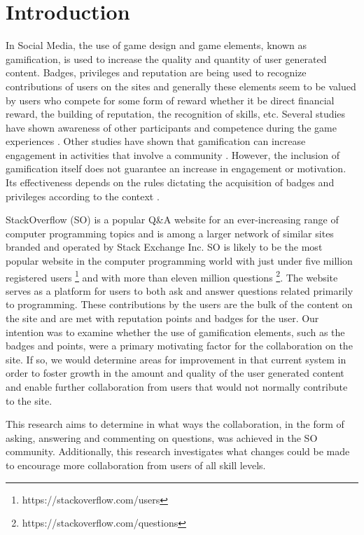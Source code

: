 \documentclass{sigchi}
\def\plainkeywords{Gamification; StackOverflow (SO)}
\begin{document}
\keywords{\plainkeywords}


\section{Introduction}
In Social Media, the use of game design and game elements, known as gamification, is used to increase the quality and quantity of user generated content. Badges, privileges and reputation are being used to recognize contributions of users on the sites and generally these elements seem to be valued by users who compete for some form of reward whether it be direct financial reward, the building of reputation, the recognition of skills, etc. Several studies have shown awareness of other participants and competence during the game experiences \cite{Rughinis}. Other studies have shown that gamification can increase engagement in activities that involve a community \cite{Marder}. However, the inclusion of gamification itself does not guarantee an increase in engagement or motivation. Its effectiveness depends on the rules dictating the acquisition of badges and privileges according to the context \cite{Deterding}.

StackOverflow (SO) is a popular Q\&A website for an ever-increasing range of computer programming topics and is among a larger network of similar sites branded and operated by Stack Exchange Inc. SO is likely to be the most popular website in the computer programming world with just under five million registered users \footnote{https://stackoverflow.com/users} and with more than eleven million questions \footnote{https://stackoverflow.com/questions}. The website serves as a platform for users to both ask and answer questions related primarily to programming. These contributions by the users are the bulk of the content on the site and are met with reputation points and badges for the user. Our intention was to examine whether the use of gamification elements, such as the badges and points, were a primary motivating factor for the collaboration on the site. If so, we would determine areas for improvement in that current system in order to foster growth in the amount and quality of the user generated content and enable further collaboration from users that would not normally contribute to the site.

This research aims to determine in what ways the collaboration, in the form of asking, answering and commenting on questions, was achieved in the SO community.
Additionally, this research investigates what changes could be made to encourage more collaboration from users of all skill levels.
\end{document}
